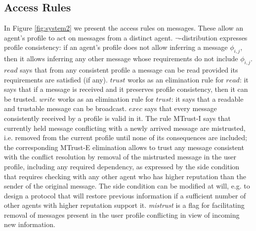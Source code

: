\documentclass[compsoc, conference, letterpaper, 10pt, times]{IEEEtran}
\begin{document}
\subsection{Access Rules}

In Figure \ref{fig:system2} we present the access rules on messages. These allow an agent's profile to act on messages from a distinct agent. $\neg$-distribution expresses profile consistency: if an agent's profile does not allow inferring a message $\phi_{i,j}$, then it allows inferring any other message whose requirements do not include $\phi_{i,j}$. $\mathit{read}$ says that from any consistent profile a message can be read provided its requirements are satisfied (if any). $\mathit{trust}$ works as an elimination rule for $read$: it says that if a message is received and it preserves profile consistency, then it can be trusted. $\mathit{write}$ works as an elimination rule for $trust$: it says that a readable and trustable message can be broadcast. $\mathit{exec}$ says that every message consistently received by a profile is valid in it. The rule MTrust-I says that currently held message conflicting with a newly arrived message are mistrusted, i.e. removed from the current profile until none of its consequences are included; the corresponding MTrust-E elimination allows to trust any message consistent with the conflict resolution by removal of the mistrusted message in the user profile, including any required dependency, as expressed by the side condition that requires checking with any other agent who has higher reputation than the sender of the original message. The side condition can be modified at will, e.g. to design a protocol that will restore previous information if a sufficient number of other agents with higher reputation support it. \textit{mistrust} is a flag for facilitating removal of messages present in the user profile conflicting in view of incoming new information. 
\end{document}
